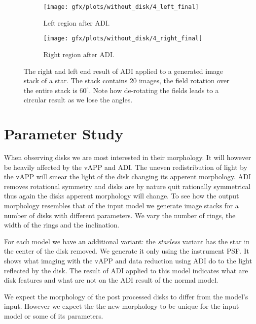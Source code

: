 \begin{figure}[h!]
      \begin{subfigure}[b]{0.5\textwidth}
        \texttt{[image: gfx/plots/without\_disk/4\_left\_final]}
        \caption{Left region after \ac{ADI}.}
      \end{subfigure}%
      \begin{subfigure}[b]{0.5\textwidth}
        \texttt{[image: gfx/plots/without\_disk/4\_right\_final]}
        \caption{Right region after \ac{ADI}.}
      \end{subfigure}      

  \caption{The right and left end result of \ac{ADI} applied to a generated image stack of a star. The stack contains 20 images, the field rotation over the entire stack is $60^{\circ}$. Note how de-rotating the fields leads to a circular result as we lose the angles.}
  \label{fig:adi_star_only}
\end{figure}

\section{Parameter Study}
\label{sec:paramstudy}
When observing disks we are most interested in their morphology. It will however be heavily affected by the \ac{vAPP} and \ac{ADI}. The uneven redistribution of light by the \ac{vAPP} will smear the light of the disk changing its apperent morphology. \ac{ADI} removes rotational symmetry and disks are by nature quit rationally symmetrical thus again the disks apperent morphology will change. To see how the output morphology resembles that of the input model we generate image stacks for a number of disks with different parameters. We vary the number of rings, the width of the rings and the inclination.

For each model we have an additional variant: the \textit{starless} variant has the star in the center of the disk removed. We generate it only using the instrument \ac{PSF}. It shows what imaging with the \ac{vAPP} and data reduction using \ac{ADI} do to the light reflected by the disk. The result of \ac{ADI} applied to this model indicates what are disk features and what are not on the \ac{ADI} result of the normal model.


We expect the morphology of the post processed disks to differ from the model's input. However we expect the the new morphology to be unique for the input model or some of its parameters.


